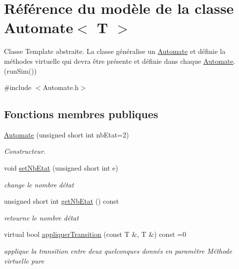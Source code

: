 \hypertarget{class_automate}{}\section{Référence du modèle de la classe Automate$<$ T $>$}
\label{class_automate}


Classe Template abstraite. La classe généralise un \hyperlink{class_automate}{Automate} et définie la méthodes virtuelle qui devra être présente et définie dans chaque \hyperlink{class_automate}{Automate}. (run\+Sim())  




{\ttfamily \#include $<$Automate.\+h$>$}

\subsection*{Fonctions membres publiques}
\begin{DoxyCompactItemize}
\item 
\hyperlink{class_automate_a3215065f896b7297a676219a0d80a045}{Automate} (unsigned short int nb\+Etat=2)
\begin{DoxyCompactList}\small\item\em Constructeur. \end{DoxyCompactList}\item 
void \hyperlink{class_automate_afcf89728c989465400a19174ef22dfa5}{set\+Nb\+Etat} (unsigned short int e)
\begin{DoxyCompactList}\small\item\em change le nombre d\textquotesingle{}état \end{DoxyCompactList}\item 
unsigned short int \hyperlink{class_automate_a80d9f6cfc6786ac21b51c4ab7fcb072d}{get\+Nb\+Etat} () const 
\begin{DoxyCompactList}\small\item\em retourne le nombre d\textquotesingle{}état \end{DoxyCompactList}\item 
virtual bool \hyperlink{class_automate_a123c24c274f8f02dd9e2635eedf54533}{appliquer\+Transition} (const T \&, T \&) const =0
\begin{DoxyCompactList}\small\item\em applique la transition entre deux quelconques donnés en paramètre Méthode virtuelle pure \end{DoxyCompactList}\end{DoxyCompactItemize}
